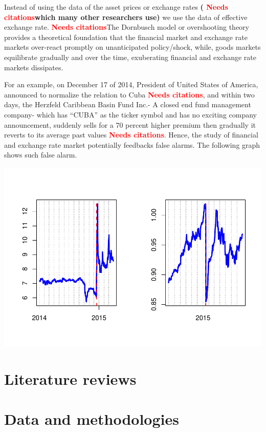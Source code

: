 \documentclass[]{elsarticle} %
\makeatletter
\def\maxwidth{\ifdim\Gin@nat@width>\linewidth\linewidth
\else\Gin@nat@width\fi}
\let\Oldincludegraphics\includegraphics
\renewcommand{\includegraphics}[1]{\Oldincludegraphics[width=\maxwidth]{#1}}
\makeatother
\begin{document}
Instead of using the data of the asset prices or exchange rates
\textbf{( \textcolor{red}{Needs citations}which many other researchers
use)} we use the data of effective exchange rate.
\textbf{\textcolor{red}{Needs citations}}The Dornbusch model or
overshooting theory provides a theoretical foundation that the financial
market and exchange rate markets over-react promptly on unanticipated
policy/shock, while, goods markets equilibrate gradually and over the
time, exuberating financial and exchange rate markets dissipates.

For an example, on December 17 of 2014, President of United States of
America, announced to normalize the relation to Cuba
\textbf{\textcolor{red}{Needs citations}}, and within two days, the
Herzfeld Caribbean Basin Fund Inc.- A closed end fund management
company- which has ``CUBA'' as the ticker symbol and has no exciting
company announcement, suddenly sells for a 70 percent higher premium
then gradually it reverts to its average past values
\textbf{\textcolor{red}{Needs citations}}. Hence, the study of financial
and exchange rate market potentially feedbacks false alarms. The
following graph shows such false alarm.

\includegraphics{Main_files/figure-latex/unnamed-chunk-1-1.pdf}

\section{Literature reviews}\label{literature-reviews}

\section{Data and methodologies}\label{data-and-methodologies}
\end{document}
